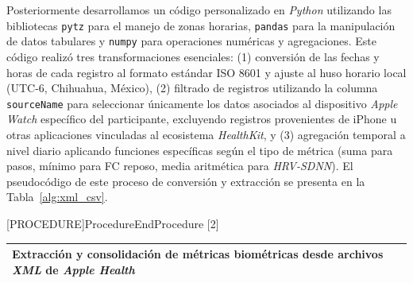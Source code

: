 Posteriormente desarrollamos un código personalizado en \textit{Python} utilizando las bibliotecas \texttt{pytz} para el manejo de zonas horarias, \texttt{pandas} para la manipulación de datos tabulares y \texttt{numpy} para operaciones numéricas y agregaciones. Este código realizó tres transformaciones esenciales: (1) conversión de las fechas y horas de cada registro al formato estándar ISO 8601 y ajuste al huso horario local (UTC-6, Chihuahua, México), (2) filtrado de registros utilizando la columna \texttt{sourceName} para seleccionar únicamente los datos asociados al dispositivo \textit{Apple Watch} específico del participante, excluyendo registros provenientes de iPhone u otras aplicaciones vinculadas al ecosistema \textit{HealthKit}, y (3) agregación temporal a nivel diario aplicando funciones específicas según el tipo de métrica (suma para pasos, mínimo para FC reposo, media aritmética para \textit{HRV-SDNN}). El pseudocódigo de este proceso de conversión y extracción se presenta en la Tabla~\ref{alg:xml_csv}.

\algrenewcommand{}
\algrenewcommand{}
\algrenewcommand{}
\algrenewcommand{}
\algrenewcommand{}
\algrenewcommand{}
\algrenewcommand{}
\algrenewcommand\algorithmicelsif{\algorithmicelse\ \algorithmicif}
\algrenewcommand\algorithmicendif{\algorithmicend\ \algorithmicif}
\algrenewcommand\algorithmicendfor{\algorithmicend\ \algorithmicfor}
\algrenewcommand\algorithmicendprocedure{\algorithmicend\ \algorithmicprocedure}

\makeatletter
{}[PROCEDURE]{Procedure}{EndProcedure}%
   [2]{\algorithmicprocedure\ }%
   {\algorithmicend\ \algorithmicprocedure}%
\makeatother

\noindent
{}
\label{alg:xml_csv}

\noindent
\begin{tabularx}{\textwidth}{@{}X@{}}
\toprule
    {\normalfont\fontsize{12}{14}\selectfont Extracción y consolidación de métricas biométricas desde archivos \textit{XML} de \textit{Apple Health}} \\
\toprule
\end{tabularx}

